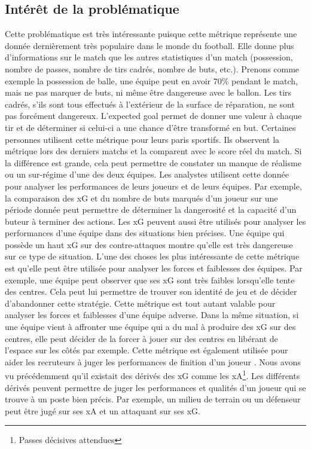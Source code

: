 \documentclass[12pt]{article}
\begin{document}
\subsection{Intérêt de la problématique}
Cette problématique est très intéressante puisque cette métrique représente une donnée dernièrement très populaire dans le monde du football. Elle donne plus d'informations sur le match que les autres statistiques d'un match (possession, nombre de passes, nombre de tirs cadrés, nombre de buts, etc.). 
Prenons comme exemple la possession de balle, une équipe peut en avoir 70\% pendant le match, mais ne pas marquer de buts, ni même être dangereuse avec le ballon. 
Les tirs cadrés, s'ils sont tous effectués à l'extérieur de la surface de réparation, ne sont pas forcément dangereux. 
L'expected goal permet de donner une valeur à chaque tir et de déterminer si celui-ci a une chance d'être transformé en but.
\newline \newline
Certaines personnes utilisent cette métrique pour leurs paris sportifs. 
Ils observent la métrique lors des derniers matchs et la comparent avec le score réel du match. 
Si la différence est grande, cela peut permettre de constater un manque de réalisme ou un sur-régime d'une des deux équipes. \cite{tennerelBienUtiliserExpected2022a}
\newline \newline
Les analystes utilisent cette donnée pour analyser les performances de leurs joueurs et de leurs équipes. Par exemple, la comparaison des xG et du nombre de buts marqués d'un joueur sur une période donnée peut permettre de déterminer la dangerosité et la capacité d'un buteur à terminer des actions. \cite{pettyWhatExpectedGoals2018a}
Les xG peuvent aussi être utilisés pour analyser les performances d'une équipe dans des situations bien précises. Une équipe qui possède un haut xG sur des contre-attaques montre qu'elle est très dangereuse sur ce type de situation. \cite{XGExplainedFBrefa}
L'une des choses les plus intéressante de cette métrique est qu'elle peut être utilisée pour analyser les forces et faiblesses des équipes. Par exemple, une équipe peut observer que ses xG sont très faibles lorsqu'elle tente des centres. Cela peut lui permettre de trouver son identité de jeu et de décider d'abandonner cette stratégie. Cette métrique est tout autant valable pour analyser les forces et faiblesses d'une équipe adverse. 
Dans la même situation, si une équipe vient à affronter une équipe qui a du mal à produire des xG sur des centres, elle peut décider de la forcer à jouer sur des centres en libérant de l'espace sur les côtés par exemple.
\newline \newline
Cette métrique est également utilisée pour aider les recruteurs à juger les performances de finition d'un joueur \cite{garratt-stanleyWhatExpectedGoals2022}. Nous avons vu précédemment qu'il existait des dérivés des xG comme les xA\footnote{Passes décisives attendues}. 
Les différents dérivés peuvent permettre de juger les performances et qualités d'un joueur qui se trouve à un poste bien précis. 
Par exemple, un milieu de terrain ou un défenseur peut être jugé sur ses xA et un attaquant sur ses xG.
\end{document}
